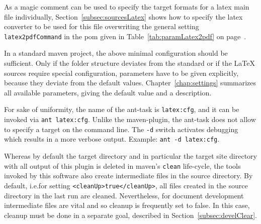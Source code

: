 As a magic comment can be used 
to specify the target formats for a latex main file individually, 
Section~\ref{subsec:sourcesLatex} shows 
how to specify the latex converter to be used for this file 
overwriting the general setting \texttt{latex2pdfCommand} in the pom 
given in Table~\ref{tab:paramLatex2pdf} on page~\pageref{subsec:sourcesLatex}. 




% 



In a standard maven project, 
the above minimal configuration should be sufficient. 
Only if the folder structure deviates from the standard 
or if the \LaTeX{} sources require special configuration, 
parameters have to be given explicitly, 
because they deviate from the default values. 
Chapter~\ref{chap:settings} summarizes all available parameters, 
giving the default value and a description. 


For sake of uniformity, 
the name of the ant-task is \texttt{latex:cfg}, 
and it can be invoked via \texttt{ant latex:cfg}. 
Unlike the maven-plugin, the ant-task 
does not allow to specify a target on the command line. 
The \texttt{-d} switch activates debugging 
which results in a more verbose output. 
Example: \texttt{ant -d latex:cfg}. 

Whereas by default the target directory and in particular 
the target site directory with all output of this plugin is deleted 
in maven's \texttt{clean} life-cycle, 
the tools invoked by this software also create intermediate files 
in the source directory. 
By default, i.e.\@ for setting \texttt{<cleanUp>true</cleanUp>}, 
all files created in the source directory in the last run are cleaned. 
Nevertheless, for document development intermediate files are vital 
and so cleanup is frequently set to false. 
In this case, cleanup must be done in a separate goal, 
described in Section~\ref{subsec:develClear}. 

